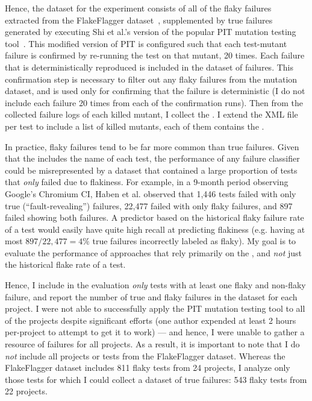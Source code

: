 Hence, the dataset for the experiment consists of all of the flaky failures extracted from the FlakeFlagger dataset~\cite{alshammari2021flakeflagger}, supplemented by true failures generated by executing Shi et al.'s version of the popular PIT mutation testing tool~\cite{shi2019mitigating,coles2016pit}.
This modified version of PIT is configured such that each test-mutant failure is confirmed by re-running the test on that mutant, 20 times.
Each failure that is deterministically reproduced is included in the dataset of failures.
This confirmation step is necessary to filter out any flaky failures from the mutation dataset, and is used only for confirming that the failure is deterministic (I do not include each failure 20 times from each of the confirmation runs).
Then from the collected failure logs of each killed mutant, I collect the \failures. I extend the XML file per test to include a list of killed mutants, each of them contains the \failure. 

In practice, flaky failures tend to be far more common than true failures.
Given that the \failure includes the name of each test, the performance of any failure classifier could be misrepresented by a dataset that contained a large proportion of tests that \emph{only} failed due to flakiness.
For example, in a 9-month period observing Google's Chromium CI, Haben et al. observed that 1,446 tests failed with only true (``fault-revealing'') failures, 22,477 failed with only flaky failures, and 897 failed showing both failures.
A predictor based on the historical flaky failure rate of a test would easily have quite high recall at predicting flakiness (e.g. having at most $897/22,477=4\%$ true failures incorrectly labeled as flaky). 
My goal is to evaluate the performance of approaches that rely primarily on the \failure, and \emph{not} just the historical flake rate of a test.

Hence, I include in the evaluation \emph{only} tests with at least one flaky and non-flaky failure, and report the number of true and flaky failures in the dataset for each project.
I were not able to successfully apply the PIT mutation testing tool to all of the projects despite significant efforts (one author expended at least 2 hours per-project to attempt to get it to work) --- and hence, I were unable to gather a resource of failures for all projects.
As a result, it is important to note that I do \emph{not} include all projects or tests from the FlakeFlagger dataset.
Whereas the FlakeFlagger dataset includes 811 flaky tests from 24 projects, I analyze only those tests for which I could collect a dataset of true failures: 543 flaky tests from 22 projects.

